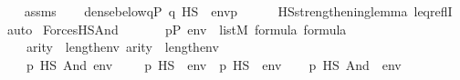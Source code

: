 \begin{isabellebody}
\ \ \isamarkupfalse%
\ assms\isanewline
\ \ \isamarkupfalse%
\ {\isachardoublequoteopen}dense{\isacharunderscore}{\kern0pt}below{\isacharparenleft}{\kern0pt}{\isacharbraceleft}{\kern0pt}q{\isasymin}P{\isachardot}{\kern0pt}\ q\ {\isasymtturnstile}HS\ {\isasymphi}\ env{\isacharbraceright}{\kern0pt}{\isacharcomma}{\kern0pt}p{\isacharparenright}{\kern0pt}{\isachardoublequoteclose}\isanewline
\ \ \ \ \isamarkupfalse%
\ HS{\isacharunderscore}{\kern0pt}strengthening{\isacharunderscore}{\kern0pt}lemma\ leq{\isacharunderscore}{\kern0pt}reflI\ \isamarkupfalse%
\ auto\isanewline
{}\isamarkupfalse%
%
\endisatagproof
{\isafoldproof}%
%
\isadelimproof
\isanewline
%
\endisadelimproof
\isanewline
{}\isamarkupfalse%
\ ForcesHS{\isacharunderscore}{\kern0pt}And{\isacharcolon}{\kern0pt}\isanewline
\ \ \isanewline
\ \ \ \ {\isachardoublequoteopen}p{\isasymin}P{\isachardoublequoteclose}\ {\isachardoublequoteopen}env\ {\isasymin}\ list{\isacharparenleft}{\kern0pt}M{\isacharparenright}{\kern0pt}{\isachardoublequoteclose}\ {\isachardoublequoteopen}{\isasymphi}{\isasymin}formula{\isachardoublequoteclose}\ {\isachardoublequoteopen}{\isasympsi}{\isasymin}formula{\isachardoublequoteclose}\ \isanewline
\ \ \ \ {\isachardoublequoteopen}arity{\isacharparenleft}{\kern0pt}{\isasymphi}{\isacharparenright}{\kern0pt}\ {\isasymle}\ length{\isacharparenleft}{\kern0pt}env{\isacharparenright}{\kern0pt}{\isachardoublequoteclose}\ {\isachardoublequoteopen}arity{\isacharparenleft}{\kern0pt}{\isasympsi}{\isacharparenright}{\kern0pt}\ {\isasymle}\ length{\isacharparenleft}{\kern0pt}env{\isacharparenright}{\kern0pt}{\isachardoublequoteclose}\isanewline
\ \ \isanewline
\ \ \ \ {\isachardoublequoteopen}p\ {\isasymtturnstile}HS\ And{\isacharparenleft}{\kern0pt}{\isasymphi}{\isacharcomma}{\kern0pt}{\isasympsi}{\isacharparenright}{\kern0pt}\ env\ \ \ {\isasymlongleftrightarrow}\ \ {\isacharparenleft}{\kern0pt}p\ {\isasymtturnstile}HS\ {\isasymphi}\ env{\isacharparenright}{\kern0pt}\ {\isasymand}\ {\isacharparenleft}{\kern0pt}p\ {\isasymtturnstile}HS\ {\isasympsi}\ env{\isacharparenright}{\kern0pt}{\isachardoublequoteclose}\isanewline
%
\isadelimproof
%
\endisadelimproof
%
\isatagproof
{}\isamarkupfalse%
\isanewline
\ \ \isamarkupfalse%
\ {\isachardoublequoteopen}p\ {\isasymtturnstile}HS\ And{\isacharparenleft}{\kern0pt}{\isasymphi}{\isacharcomma}{\kern0pt}\ {\isasympsi}{\isacharparenright}{\kern0pt}\ env{\isachardoublequoteclose}\isanewline

\end{isabellebody}
